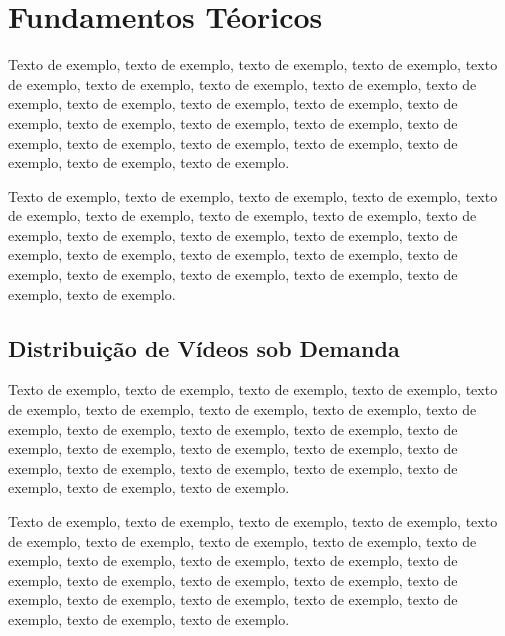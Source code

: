 \documentclass[
	12pt,				%
	oneside,			%
	a4paper,			%
	english,			%
	brazil				%
	]{abntex2ppgsi}
\begin{document}




\chapter{Fundamentos Téoricos}

Texto de exemplo, texto de exemplo, texto de exemplo, texto de exemplo, texto de exemplo, texto de exemplo, texto de exemplo, texto de exemplo, texto de exemplo, texto de exemplo, texto de exemplo, texto de exemplo, texto de exemplo, texto de exemplo, texto de exemplo, texto de exemplo, texto de exemplo, texto de exemplo, texto de exemplo, texto de exemplo, texto de exemplo, texto de exemplo, texto de exemplo.

Texto de exemplo, texto de exemplo, texto de exemplo, texto de exemplo, texto de exemplo, texto de exemplo, texto de exemplo, texto de exemplo, texto de exemplo, texto de exemplo, texto de exemplo, texto de exemplo, texto de exemplo, texto de exemplo, texto de exemplo, texto de exemplo, texto de exemplo, texto de exemplo, texto de exemplo, texto de exemplo, texto de exemplo, texto de exemplo.

\section{Distribuição de Vídeos sob Demanda}

Texto de exemplo, texto de exemplo, texto de exemplo, texto de exemplo, texto de exemplo, texto de exemplo, texto de exemplo, texto de exemplo, texto de exemplo, texto de exemplo, texto de exemplo, texto de exemplo, texto de exemplo, texto de exemplo, texto de exemplo, texto de exemplo, texto de exemplo, texto de exemplo, texto de exemplo, texto de exemplo, texto de exemplo, texto de exemplo, texto de exemplo.

Texto de exemplo, texto de exemplo, texto de exemplo, texto de exemplo, texto de exemplo, texto de exemplo, texto de exemplo, texto de exemplo, texto de exemplo, texto de exemplo, texto de exemplo, texto de exemplo, texto de exemplo, texto de exemplo, texto de exemplo, texto de exemplo, texto de exemplo, texto de exemplo, texto de exemplo, texto de exemplo, texto de exemplo, texto de exemplo, texto de exemplo.
\end{document}
